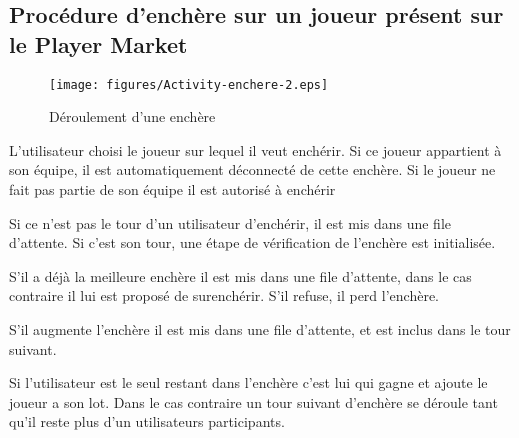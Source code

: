 \subsection{Procédure d'enchère sur un joueur présent sur le Player Market}
\label{fig:Enchere}
\begin{figure}[h!]
  \centering
  \texttt{[image: figures/Activity-enchere-2.eps]}
  \caption{\label{fig:Enchere} Déroulement d'une enchère}
\end{figure}
\begin{list}{}{\leftmargin=1.5em}
\item{L'utilisateur choisi le joueur sur lequel il veut enchérir. Si ce joueur appartient à son équipe, il est automatiquement déconnecté de cette enchère. Si le joueur ne fait pas partie de son équipe il est autorisé à enchérir}
\item{Si ce n'est pas  le tour d'un utilisateur d'enchérir, il est mis dans une file d'attente. Si c'est son tour, une étape de vérification de l'enchère est initialisée.}
\item{S'il a déjà la meilleure enchère il est mis dans une file d'attente, dans le cas contraire il lui est proposé de surenchérir. S'il refuse, il perd l'enchère.}
\item{S'il augmente l'enchère il est mis dans une file d'attente, et est inclus dans le tour suivant.}
\item{Si l'utilisateur est le seul restant dans l'enchère c'est lui qui gagne et ajoute le joueur a son lot. Dans le cas contraire un tour suivant d'enchère se déroule tant qu'il reste plus d'un utilisateurs participants.}
\end{list}
%
%
%
